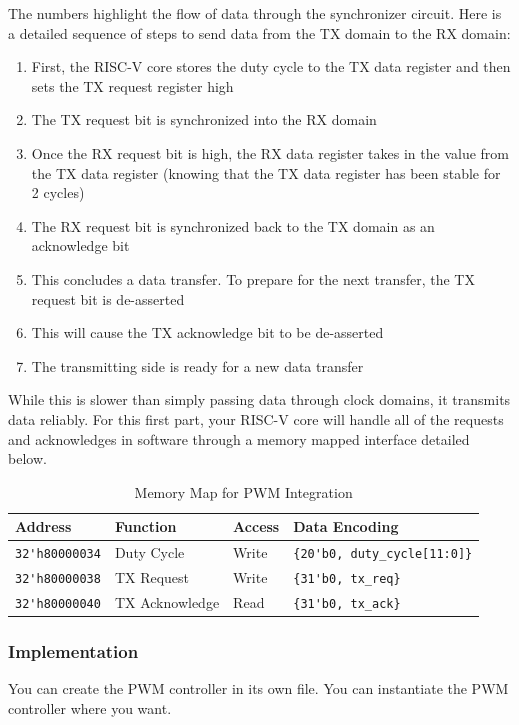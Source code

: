 \documentclass[11pt]{article}
\begin{document}
The numbers highlight the flow of data through the synchronizer circuit.
Here is a detailed sequence of steps to send data from the TX domain to the RX domain:
\begin{enumerate}
    \item First, the RISC-V core stores the duty cycle to the TX data register and then sets the TX request register high
    \item The TX request bit is synchronized into the RX domain
    \item Once the RX request bit is high, the RX data register takes in the value from the TX data register (knowing that the TX data register has been stable for 2 cycles)
    \item The RX request bit is synchronized back to the TX domain as an acknowledge bit
    \item This concludes a data transfer. To prepare for the next transfer, the TX request bit is de-asserted
    \item This will cause the TX acknowledge bit to be de-asserted
    \item The transmitting side is ready for a new data transfer
\end{enumerate}

While this is slower than simply passing data through clock domains, it transmits data reliably.
For this first part, your RISC-V core will handle all of the requests and acknowledges in software through a memory mapped interface detailed below.

\begin{table}[hbt]
  \begin{center}
    \caption{Memory Map for PWM Integration}
    \label{mem_map2}
    \begin{tabular}{l l l l}
      \toprule
      \textbf{Address} & \textbf{Function} & \textbf{Access} & \textbf{Data Encoding}\\
      \midrule
      \verb|32'h80000034| & Duty Cycle & Write & \verb|{20'b0, duty_cycle[11:0]}| \\
      \verb|32'h80000038| & TX Request & Write & \verb|{31'b0, tx_req}| \\
      \midrule
      \verb|32'h80000040| & TX Acknowledge & Read & \verb|{31'b0, tx_ack}| \\
      \midrule
    \end{tabular}
  \end{center}
\end{table}

\subsubsection{Implementation}
You can create the PWM controller in its own file.
You can instantiate the PWM controller where you want.
\end{document}
